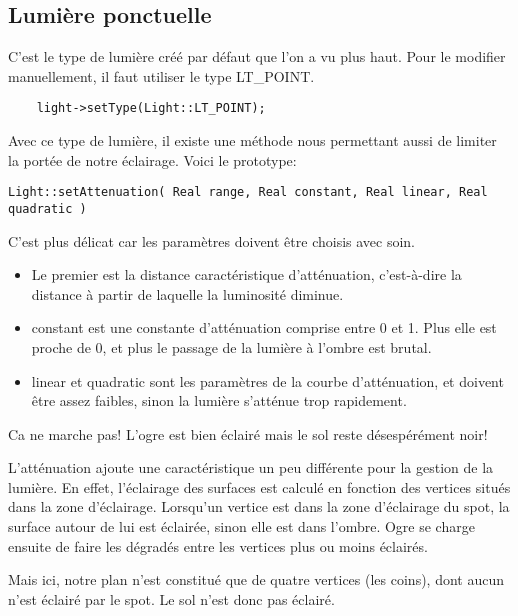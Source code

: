 \documentclass[10pt,a4paper]{report}
\begin{document}
\subsection{Lumi\`ere ponctuelle}
C'est le type de lumi\`ere cr\'e\'e par d\'efaut que l'on a vu plus haut. Pour le modifier manuellement, il faut utiliser le type LT\_POINT.

\begin{lstlisting}
	light->setType(Light::LT_POINT);
\end{lstlisting}


Avec ce type de lumi\`ere, il existe une m\'ethode nous permettant aussi de limiter la port\'ee de notre \'eclairage. Voici le prototype:
\begin{lstlisting}
Light::setAttenuation( Real range, Real constant, Real linear, Real quadratic )
\end{lstlisting}



C'est plus d\'elicat car les param\`etres doivent \^etre choisis avec soin. 
\begin{itemize}
\item Le premier est la distance caract\'eristique d'att\'enuation, c'est-\`{a}-dire la distance \`{a} partir de laquelle la luminosit\'e diminue. 
\item constant est une constante d'att\'enuation comprise entre 0 et 1. Plus elle est proche de 0, et plus le passage de la lumi\`ere \`{a} l'ombre est brutal.
\item linear et quadratic sont les param\`etres de la courbe d'att\'enuation, et doivent \^etre assez faibles, sinon la lumi\`ere s'att\'enue trop rapidement.
\end{itemize}
	


Ca ne marche pas! L'ogre est bien \'eclair\'e mais le sol reste d\'esesp\'er\'ement noir!

L'att\'enuation ajoute une caract\'eristique un peu diff\'erente pour la gestion de la lumi\`ere. En effet, l'\'eclairage des surfaces est calcul\'e en fonction des vertices situ\'es dans la zone d'\'eclairage. Lorsqu'un vertice est dans la zone d'\'eclairage du spot, la surface autour de lui est \'eclair\'ee, sinon elle est dans l'ombre. Ogre se charge ensuite de faire les d\'egrad\'es entre les vertices plus ou moins \'eclair\'es.

Mais ici, notre plan n'est constitu\'e que de quatre vertices (les coins), dont aucun n'est \'eclair\'e par le spot. Le sol n'est donc pas \'eclair\'e.
\end{document}

